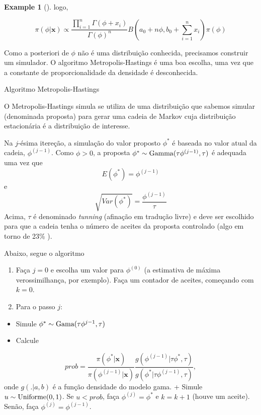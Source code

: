 \documentclass[
  letterpaper,
  DIV=11,
  numbers=noendperiod]{scrreprt}
\providecommand{\tightlist}{%
  \setlength{\itemsep}{0pt}\setlength{\parskip}{0pt}}\usepackage{longtable,booktabs,array}
\theoremstyle{definition}
\theoremstyle{plain}
\theoremstyle{definition}
\newtheorem{example}{Example}[chapter]
\theoremstyle{remark}
\begin{document}
\begin{example}[]
logo,

\[\pi(\phi|\boldsymbol{x})\propto \frac{\prod_{i=1}^n\Gamma(\phi+x_i)}{\Gamma(\phi)^n}B\left(a_0+n\phi,b_0+\sum_{i=1}^nx_i\right)\pi(\phi)\]

Como a posteriori de \(\phi\) não é uma distribuição conhecida,
precisamos construir um simulador. O algoritmo Metropolis-Hastings é uma
boa escolha, uma vez que a constante de proporcionalidade da densidade é
desconhecida.

Algoritmo Metropolis-Hastings

O Metropolis-Hastings simula se utiliza de uma distribuição que sabemos
simular (denominada proposta) para gerar uma cadeia de Markov cuja
distribuição estacionária é a distribuição de interesse.

Na \(j\)-ésima itereção, a simulação do valor proposto \(\phi^*\) é
baseada no valor atual da cadeia, \(\phi^{(j-1)}\). Como \(\phi>0\), a
proposta \(\phi^*\sim \hbox{Gamma}(\tau\phi^{(j-1)},\tau)\) é adequada
uma vez que \[E(\phi^*)=\phi^{(j-1)}\] e
\[\sqrt{Var(\phi^*)}=\frac{\phi^{(j-1)}}{\tau}\] Acima, \(\tau\) é
denominado \emph{tunning} (afinação em tradução livre) e deve ser
escolhido para que a cadeia tenha o número de aceites da proposta
controlado (algo em torno de 23\% ).

Abaixo, segue o algoritmo

\begin{enumerate}
\def\labelenumi{\arabic{enumi}.}
\item
  Faça \(j=0\) e escolha um valor para \(\phi^{(0)}\) (a estimativa de
  máxima verossimilhança, por exemplo). Faça um contador de aceites,
  começando com \(k=0\).
\item
  Para o passo \(j\):
\end{enumerate}

\begin{itemize}
\tightlist
\item
  Simule \(\phi^*\sim\hbox{Gama}(\tau\phi^{j-1},\tau)\)
\item
  Calcule
\end{itemize}

\[prob = \frac{\pi(\phi^*|\boldsymbol{x})}{\pi(\phi^{(j-1)}|\boldsymbol{x})}\frac{g(\phi^{(j-1)}|\tau\phi^*,\tau)}{g(\phi^*|\tau\phi^{(j-1)},\tau)},\]
onde \(g(.|a,b)\) é a função densidade do modelo gama. + Simule
\(u\sim\hbox{Uniforme}(0,1)\). Se \(u<prob\), faça \(\phi^{(j)}=\phi^*\)
e \(k=k+1\) (houve um aceite). Senão, faça \(\phi^{(j)}=\phi^{(j-1)}\).



\end{example}
\end{document}

